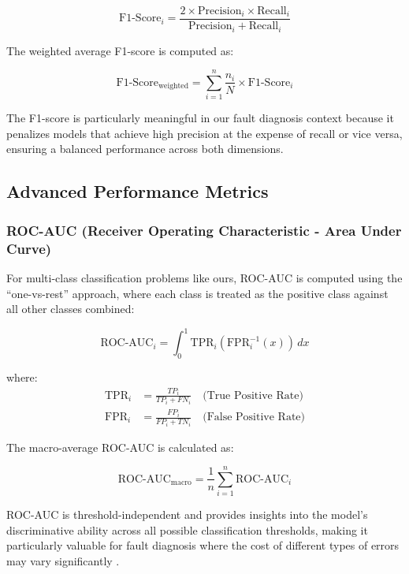 \begin{equation}
\text{F1-Score}_i = \frac{2 \times \text{Precision}_i \times \text{Recall}_i}{\text{Precision}_i + \text{Recall}_i}
\end{equation}

The weighted average F1-score is computed as:

\begin{equation}
\text{F1-Score}_{\text{weighted}} = \sum_{i=1}^{n} \frac{n_i}{N} \times \text{F1-Score}_i
\end{equation}

The F1-score is particularly meaningful in our fault diagnosis context because it penalizes models that achieve high precision at the expense of recall or vice versa, ensuring a balanced performance across both dimensions.

\subsection{Advanced Performance Metrics}
\label{subsec:advanced_metrics}

\subsubsection{ROC-AUC (Receiver Operating Characteristic - Area Under Curve)}
\label{subsubsec:roc_auc}

For multi-class classification problems like ours, ROC-AUC is computed using the ``one-vs-rest'' approach, where each class is treated as the positive class against all other classes combined:

\begin{equation}
\text{ROC-AUC}_i = \int_{0}^{1} \text{TPR}_i(\text{FPR}_i^{-1}(x)) \, dx
\end{equation}

where:
\begin{align}
\text{TPR}_i &= \frac{TP_i}{TP_i + FN_i} \quad \text{(True Positive Rate)} \\
\text{FPR}_i &= \frac{FP_i}{FP_i + TN_i} \quad \text{(False Positive Rate)}
\end{align}

The macro-average ROC-AUC is calculated as:

\begin{equation}
\text{ROC-AUC}_{\text{macro}} = \frac{1}{n} \sum_{i=1}^{n} \text{ROC-AUC}_i
\end{equation}

ROC-AUC is threshold-independent and provides insights into the model's discriminative ability across all possible classification thresholds, making it particularly valuable for fault diagnosis where the cost of different types of errors may vary significantly \citep{hastie2009elements, davis2006relationship}.

